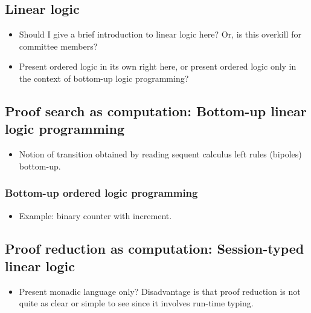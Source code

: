 \subsection{Linear logic}\label{sec:linear-logic}

\begin{itemize}
\item Should I give a brief introduction to linear logic here?  Or, is this overkill for committee members?
\item Present ordered logic in its own right here, or present ordered logic only in the context of bottom-up logic programming?
\end{itemize}

\subsection{Proof search as computation: Bottom-up linear logic programming}\label{sec:linear-lp}

\begin{itemize}
\item Notion of transition obtained by reading sequent calculus left rules  (bipoles) bottom-up.
\end{itemize}

\subsubsection{Bottom-up ordered logic programming}\label{sec:ordered-lp}

\begin{itemize}
\item Example: binary counter with increment.
\end{itemize}

\subsection{Proof reduction as computation: Session-typed linear logic}\label{sec:async-sill}

\begin{itemize}
\item Present monadic language only?  Disadvantage is that proof reduction is not quite as clear or simple to see since it involves run-time typing.
\end{itemize}

